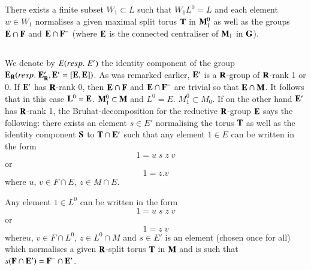 \setcounter{proposition}{14}
\begin{proposition}\label{art9-prop3.15}
There exists a finite subset $W_1 \subset L$ such that $W_1 L^0 = L$ and each element $w \in W_1$ normalises a given maximal split torus $\mathbf{T}$ in $\mathbf{M}^0_1$ as well as the groups $\mathbf{E} \cap \mathbf{F}$ and $\mathbf{E} \cap \mathbf{F}^-$ (where $\mathbf{E}$ is the connected centraliser of $\mathbf{M}_1$ in $\mathbf{G}$).
\end{proposition}

\setcounter{subsection}{15}
\subsection{}\label{art9-subsec3.16}
We denote by $E ({resp.}\kern.3em E')$ the identity component of the group $\mathbf{E}_{\mathbf{R}} ({resp.}\kern.3em \mathbf{E}'_{\mathbf{R}}, \mathbf{E}' =[\mathbf{E}, \mathbf{E}])$. As was remarked earlier, $\mathbf{E}'$ is a $\mathbf{R}$-group of $\mathbf{R}$-rank 1 or 0. If $\mathbf{E}'$ has $\mathbf{R}$-rank 0, then $\mathbf{E} \cap \mathbf{F}$ and $\mathbf{E} \cap \mathbf{F}^-$ are trivial so that $\mathbf{E} \cap \mathbf{M}$. It follows that in this case $\mathbf{L}^0 = \mathbf{E}$. $\mathbf{M}^0_1 \subset \mathbf{M}$ and $L^0 = E$. $M^0_1 \subset M_0$. If on the other hand $\mathbf{E}'$ has $\mathbf{R}$-rank 1, the Bruhat-decomposition for the reductive $\mathbf{R}$-group $\mathbf{E}$ says the following: there exists an element $s \in E'$ normalising the torus $\mathbf{T}$ as well as the identity component $\mathbf{S}$ to $\mathbf{T} \cap \mathbf{E}'$ such that any element $1 \in E$ can be written in the form
$$
1 = u \;s \;z \;v
$$
or 
$$
1 = z . v
$$
where $u$, $v \in F \cap E$, $z \in M \cap E$.

\setcounter{proposition}{16}
\begin{proposition}\label{art9-prop3.17}
Any element $1 \in L^0$ can be written in the form 
$$
1 = u \;s \;z \;v
$$
or 
$$
1 = z\; v
$$
where\pageoriginale $u$, $v \in F \cap L^0$, $z \in L^0 \cap M$ and $s \in E'$ is an element (chosen once for all) which normalises a given $\mathbf{R}$-split torus $\mathbf{T}$ in $\mathbf{M}$ and is such that $s (\mathbf{F} \cap \mathbf{E}') = \mathbf{F}^- \cap \mathbf{E}'$.
\end{proposition}
























\begin{thebibliography}{99}
\end{thebibliography}

